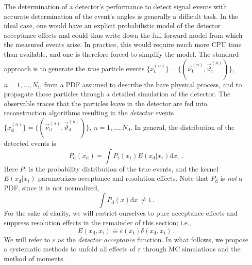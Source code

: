 \documentclass[aps,prd,reprint,nofootinbib,preprintnumbers]{revtex4}
\newcommand{\rmdx}[1]{\mbox{d} #1 \,} %
\renewcommand{\theta}{\vartheta}
\let\eps\varepsilon
\begin{document}
The determination of a detector's performance to detect signal events
with accurate determination of the event's angles is generally a
difficult task. In the ideal case, one would have an explicit
probabilistic model of the detector acceptance effects and could thus
write down the full forward model from which the measured events
arise. In practice, this would require much more CPU time than
available, and one is therefore forced to simplify the model. The
standard approach is to generate the \emph{true} particle events
$\lbrace x_\text{t}^{(n)}\rbrace =
\lbrace(\vec{\nu}^{(n)}_\text{t},\vec\theta^{(n)}_\text{t})\rbrace$,
$n=1,\dots,N_\text{t}$, from a PDF assumed to describe the bare
physical process, and to propagate those particles through a detailed
simulation of the detector.  The observable traces that the particles
leave in the detector are fed into reconstruction algorithms resulting
in the \emph{detector} events $\lbrace x^{(n)}_\text{d}\rbrace =
\lbrace(\vec{\nu}^{(n)}_\text{d}, \vec\theta^{(n)}_\text{d})\rbrace$,
$n=1,\dots,N_\text{d}$.  In general, the distribution of the detected
events is
\begin{equation}
    P_\text{d}(x_\text{d}) = \int P_\text{t}(x_\text{t}) E(x_\text{d} | x_\text{t}) \rmdx{x_\text{t}}\,.
\end{equation}
Here $P_\text{t}$ is the probability distribution of the true events,
and the kernel $E(x_\text{d}| x_\text{t})$ parametrizes acceptance and
resolution effects. Note that $P_\text{d}$ is \emph{not} a PDF, since
it is not normalized,
\begin{equation}
    \int P_\text{d}(x) \rmdx{x} \neq 1\,.
\end{equation}
For the sake of clarity, we will restrict ourselves
to pure acceptance effects and suppress resolution effects in the remainder of this section; i.e.,
\begin{equation}
    E(x_\text{d}, x_\text{t}) \equiv \eps(x_\text{t}) \delta(x_\text{d}, x_\text{t})\,.
\end{equation}
We will refer to $\eps$ as the \emph{detector acceptance} function. In what follows,
we propose a systematic methods to unfold all effects of $\eps$ through MC simulations
and the method of moments.\\
\end{document}
